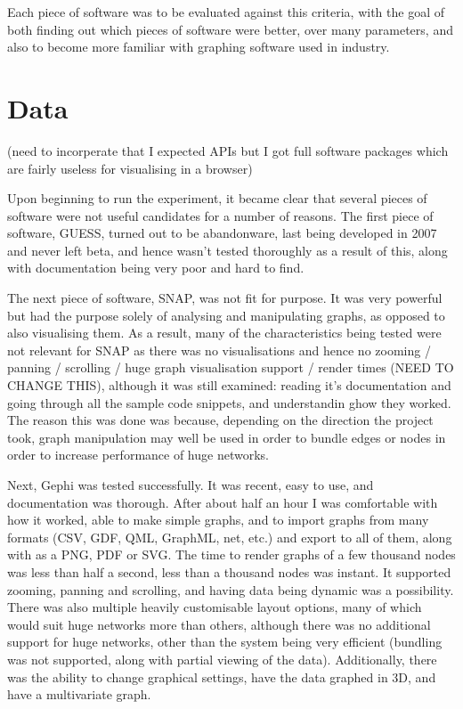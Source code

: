 Each piece of software was to be evaluated against this criteria, with the goal of both finding out which pieces of software were better, over many parameters, and also to become more familiar with graphing software used in industry.

\section{Data}

(need to incorperate that I expected APIs but I got full software packages which are fairly useless for visualising in a browser)

Upon beginning to run the experiment, it became clear that several pieces of software were not useful candidates for a number of reasons. The first piece of software, GUESS, turned out to be abandonware, last being developed in 2007 and never left beta, and hence wasn't tested thoroughly as a result of this, along with documentation being very poor and hard to find. 

The next piece of software, SNAP, was not fit for purpose. It was very powerful but had the purpose solely of analysing and manipulating graphs, as opposed to also visualising them. As a result, many of the characteristics being tested were not relevant for SNAP as there was no visualisations and hence no zooming / panning / scrolling / huge graph visualisation support / render times (NEED TO CHANGE THIS), although it was still examined: reading it's documentation and going through all the sample code snippets, and understandin ghow they worked. The reason this was done was because, depending on the direction the project took, graph manipulation may well be used in order to bundle edges or nodes in order to increase performance of huge networks. 

Next, Gephi was tested successfully. It was recent, easy to use, and documentation was thorough. After about half an hour I was comfortable with how it worked, able to make simple graphs, and to import graphs from many formats (CSV, GDF, QML, GraphML, net, etc.) and export to all of them, along with as a PNG, PDF or SVG. The time to render graphs of a few thousand nodes was less than half a second, less than a thousand nodes was instant. It supported zooming, panning and scrolling, and having data being dynamic was a possibility. There was also multiple heavily customisable layout options, many of which would suit huge networks more than others, although there was no additional support for huge networks, other than the system being very efficient (bundling was not supported, along with partial viewing of the data). Additionally, there was the ability to change graphical settings, have the data graphed in 3D, and have a multivariate graph. 

